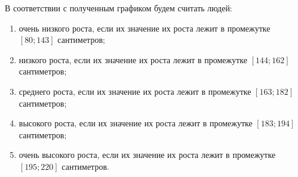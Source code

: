 
В соответствии с полученным графиком будем считать людей:
\begin{enumerate}[label=\arabic*)]
	\item очень низкого роста, если их значение их роста лежит в промежутке $[80; 143]$ сантиметров;
	\item низкого роста, если их значение их роста лежит в промежутке $[144; 162]$ сантиметров;
	\item среднего роста, если их значение их роста лежит в промежутке $[163; 182]$ сантиметров;
	\item высокого роста, если их значение их роста лежит в промежутке $[183; 194]$ сантиметров;
	\item очень высокого роста, если их значение их роста лежит в промежутке $[195; 220]$ сантиметров.
\end{enumerate}